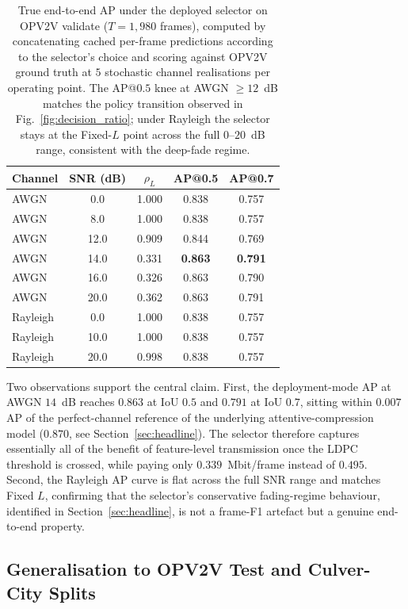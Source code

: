 \documentclass[journal]{IEEEtran}
\begin{document}
\begin{table}[t]
\centering
\caption{True end-to-end AP under the deployed selector on OPV2V validate ($T=1{,}980$ frames), computed by concatenating cached per-frame predictions according to the selector's choice and scoring against OPV2V ground truth at $5$ stochastic channel realisations per operating point. The AP@$0.5$ knee at AWGN $\ge 12$~dB matches the policy transition observed in Fig.~\ref{fig:decision_ratio}; under Rayleigh the selector stays at the Fixed-$L$ point across the full $0$--$20$~dB range, consistent with the deep-fade regime.}\label{tab:true_e2e}
\begin{tabular}{lcccc}
\toprule
Channel & SNR (dB) & $\rho_L$ & AP@0.5 & AP@0.7 \\
\midrule
AWGN     & 0.0  & 1.000 & 0.838 & 0.757 \\
AWGN     & 8.0  & 1.000 & 0.838 & 0.757 \\
AWGN     & 12.0 & 0.909 & 0.844 & 0.769 \\
AWGN     & 14.0 & 0.331 & \textbf{0.863} & \textbf{0.791} \\
AWGN     & 16.0 & 0.326 & 0.863 & 0.790 \\
AWGN     & 20.0 & 0.362 & 0.863 & 0.791 \\
Rayleigh & 0.0  & 1.000 & 0.838 & 0.757 \\
Rayleigh & 10.0 & 1.000 & 0.838 & 0.757 \\
Rayleigh & 20.0 & 0.998 & 0.838 & 0.757 \\
\bottomrule
\end{tabular}
\end{table}

Two observations support the central claim. First, the deployment-mode AP at AWGN $14$~dB reaches $0.863$ at IoU $0.5$ and $0.791$ at IoU $0.7$, sitting within $0.007$ AP of the perfect-channel reference of the underlying attentive-compression model ($0.870$, see Section~\ref{sec:headline}). The selector therefore captures essentially all of the benefit of feature-level transmission once the LDPC threshold is crossed, while paying only $0.339$~Mbit/frame instead of $0.495$. Second, the Rayleigh AP curve is flat across the full SNR range and matches Fixed $L$, confirming that the selector's conservative fading-regime behaviour, identified in Section~\ref{sec:headline}, is not a frame-F1 artefact but a genuine end-to-end property.

\subsection{Generalisation to OPV2V Test and Culver-City Splits}\label{sec:generalisation}
\end{document}
